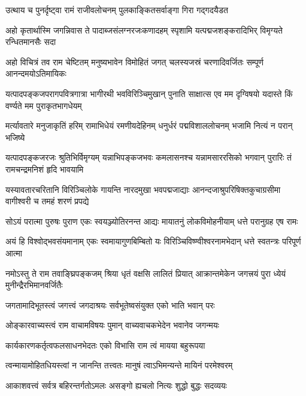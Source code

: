 \twolineshloka
{उत्थाय च पुनर्दृष्ट्वा रामं राजीवलोचनम्}
{पुलकाङ्कितसर्वाङ्गा गिरा गद्गदयैडत} %


\fourlineindentedshloka
{अहो कृतार्थास्मि जगन्निवास ते}
{पादाब्जसंलग्नरजःकणादहम्}
{स्पृशामि यत्पद्मजशङ्करादिभिर्\-}
{विमृग्यते रन्धितमानसैः सदा} %

\fourlineindentedshloka
{अहो विचित्रं तव राम चेष्टितम्}
{मनुष्यभावेन विमोहितं जगत्}
{चलस्यजस्रं चरणादिवर्जितः}
{सम्पूर्ण आनन्दमयोऽतिमायिकः} %

\fourlineindentedshloka
{यत्पादपङ्कजपरागपवित्रगात्रा}
{भागीरथी भवविरिञ्चिमुखान् पुनाति}
{साक्षात्स एव मम दृग्विषयो यदास्ते}
{किं वर्ण्यते मम पुराकृतभागधेयम्} %

\fourlineindentedshloka
{मर्त्यावतारे मनुजाकृतिं हरिम्}
{रामाभिधेयं रमणीयदेहिनम्}
{धनुर्धरं पद्मविशाललोचनम्}
{भजामि नित्यं न परान् भजिष्ये} %

\fourlineindentedshloka
{यत्पादपङ्कजरजः श्रुतिभिर्विमृग्यम्}
{यन्नाभिपङ्कजभवः कमलासनश्च}
{यन्नामसाररसिको भगवान् पुरारिः}
{तं रामचन्द्रमनिशं हृदि भावयामि} %

\fourlineindentedshloka
{यस्यावतारचरितानि विरिञ्चिलोके}
{गायन्ति नारदमुखा भवपद्मजाद्याः}
{आनन्दजाश्रुपरिषिक्तकुचाग्रसीमा}
{वागीश्वरी च तमहं शरणं प्रपद्ये} %

\fourlineindentedshloka
{सोऽयं परात्मा पुरुषः पुराण}
{एकः स्वयञ्ज्योतिरनन्त आद्यः}
{मायातनुं लोकविमोहनीयाम्}
{धत्ते परानुग्रह एष रामः} %

\fourlineindentedshloka
{अयं हि विश्वोद्भवसंयमानाम्}
{एकः स्वमायागुणबिम्बितो यः}
{विरिञ्चिविष्ण्वीश्वरनामभेदान्}
{धत्ते स्वतन्त्रः परिपूर्ण आत्मा} %

\fourlineindentedshloka
{नमोऽस्तु ते राम तवाङ्घ्रिपङ्कजम्}
{श्रिया धृतं वक्षसि लालितं प्रियात्}
{आक्रान्तमेकेन जगत्त्रयं पुरा}
{ध्येयं मुनीन्द्रैरभिमानवर्जितैः} %

\twolineshloka
{जगतामादिभूतस्त्वं जगत्त्वं जगदाश्रयः}
{सर्वभूतेष्वसंयुक्त एको भाति भवान् परः} %

\twolineshloka
{ओङ्कारवाच्यस्त्वं राम वाचामविषयः पुमान्}
{वाच्यवाचकभेदेन भवानेव जगन्मयः} %

\twolineshloka
{कार्यकारणकर्तृत्वफलसाधनभेदतः}
{एको विभासि राम त्वं मायया बहुरूपया} %

\twolineshloka
{त्वन्मायामोहितधियस्त्वां न जानन्ति तत्त्वतः}
{मानुषं त्वाऽभिमन्यन्ते मायिनं परमेश्वरम्} %

\twolineshloka
{आकाशवत्त्वं सर्वत्र बहिरन्तर्गतोऽमलः}
{असङ्गो ह्यचलो नित्यः शुद्धो बुद्धः सदव्ययः} %

